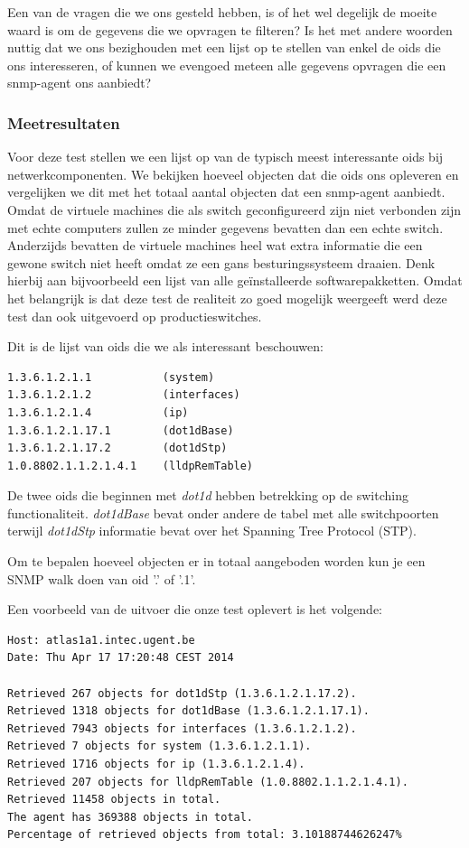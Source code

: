 Een van de vragen die we ons gesteld hebben, is of het wel degelijk de moeite waard is om de gegevens die we opvragen te filteren?
Is het met andere woorden nuttig dat we ons bezighouden met een lijst op te stellen van enkel de \glspl{oid} die ons interesseren,
of kunnen we evengoed meteen alle gegevens opvragen die een \gls{snmp-agent} ons aanbiedt?

\subsubsection{Meetresultaten}

Voor deze test stellen we een lijst op van de typisch meest interessante \glspl{oid} bij netwerkcomponenten.
We bekijken hoeveel objecten dat die \glspl{oid} ons opleveren en vergelijken we dit met het totaal aantal objecten dat een \gls{snmp-agent} aanbiedt.
Omdat de virtuele machines die als switch geconfigureerd zijn niet verbonden zijn met echte computers zullen ze minder gegevens bevatten dan een echte switch.
Anderzijds bevatten de virtuele machines heel wat extra informatie die een gewone switch niet heeft omdat ze een gans besturingssysteem draaien.
Denk hierbij aan bijvoorbeeld een lijst van alle geïnstalleerde softwarepakketten.
Omdat het belangrijk is dat deze test de realiteit zo goed mogelijk weergeeft werd deze test dan ook uitgevoerd op productieswitches.

Dit is de lijst van \glspl{oid} die we als interessant beschouwen:

\begin{lstlisting}
1.3.6.1.2.1.1			(system)
1.3.6.1.2.1.2			(interfaces)
1.3.6.1.2.1.4			(ip)
1.3.6.1.2.1.17.1 		(dot1dBase)
1.3.6.1.2.1.17.2		(dot1dStp)
1.0.8802.1.1.2.1.4.1	(lldpRemTable)
\end{lstlisting}

De twee \glspl{oid} die beginnen met \textit{dot1d} hebben betrekking op de switching functionaliteit.
\textit{dot1dBase} bevat onder andere de tabel met alle switchpoorten terwijl \textit{dot1dStp} informatie bevat over het Spanning Tree Protocol (STP).

Om te bepalen hoeveel objecten er in totaal aangeboden worden kun je een SNMP walk doen van \gls{oid} '.' of '.1'.

Een voorbeeld van de uitvoer die onze test oplevert is het volgende:

\begin{lstlisting}
Host: atlas1a1.intec.ugent.be
Date: Thu Apr 17 17:20:48 CEST 2014

Retrieved 267 objects for dot1dStp (1.3.6.1.2.1.17.2).
Retrieved 1318 objects for dot1dBase (1.3.6.1.2.1.17.1).
Retrieved 7943 objects for interfaces (1.3.6.1.2.1.2).
Retrieved 7 objects for system (1.3.6.1.2.1.1).
Retrieved 1716 objects for ip (1.3.6.1.2.1.4).
Retrieved 207 objects for lldpRemTable (1.0.8802.1.1.2.1.4.1).
Retrieved 11458 objects in total.
The agent has 369388 objects in total.
Percentage of retrieved objects from total: 3.10188744626247%
\end{lstlisting}


